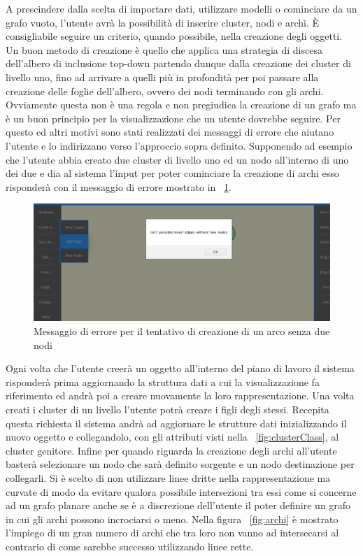 {A prescindere dalla scelta di importare dati, utilizzare modelli o cominciare da un grafo vuoto, l'utente avrà la possibilità di inserire cluster, nodi e archi. È consigliabile seguire un criterio, quando possibile, nella creazione degli oggetti. Un buon metodo di creazione è quello che applica una strategia di discesa dell'albero di inclusione top-down partendo dunque dalla creazione dei cluster di livello uno, fino ad arrivare a quelli più in profondità per poi passare alla creazione delle foglie dell'albero, ovvero dei nodi terminando con gli archi. Ovviamente questa non è una regola e non pregiudica la creazione di un grafo ma è un buon principio per la visualizzazione che un utente dovrebbe seguire. Per questo ed altri motivi sono stati realizzati dei messaggi di errore che aiutano l'utente e lo indirizzano verso l'approccio sopra definito. Supponendo ad esempio che l'utente abbia creato due cluster di livello uno ed un nodo all'interno di uno dei due e dia al sistema l'input per poter cominciare la creazione di archi esso risponderà con il messaggio di errore mostrato in \figurename~\ref{fig:erroreArco}.
\begin{figure}[!htb]
	\begin{center}
		\includegraphics[width=0.8 \linewidth]{figure/erroreArco}
	\end{center}
	\caption{Messaggio di errore per il tentativo di creazione di un arco senza due nodi\label{fig:erroreArco}}
\end{figure}
\newline
Ogni volta che l'utente creerà un oggetto all'interno del piano di lavoro il sistema risponderà prima aggiornando la struttura dati a cui la visualizzazione fa riferimento ed andrà poi a creare nuovamente la loro rappresentazione. Una volta creati i cluster di un livello l'utente potrà creare i figli degli stessi. Recepita questa richiesta il sistema andrà ad aggiornare le strutture dati inizializzando il nuovo oggetto e collegandolo, con gli attributi visti nella \figurename~\ref{fig:clusterClass}, al cluster genitore.
Infine per quando riguarda la creazione degli archi all'utente basterà selezionare un nodo che sarà definito sorgente e un nodo destinazione per collegarli. Si è scelto di non utilizzare linee dritte nella rappresentazione ma curvate di modo da evitare qualora possibile intersezioni tra essi come si concerne ad un grafo planare anche se è a discrezione dell'utente il poter definire un grafo in cui gli archi possono incrociarsi o meno. Nella figura \figurename~\ref{fig:archi} è mostrato l'impiego di un gran numero di archi che tra loro non vanno ad intersecarsi al contrario di come sarebbe successo utilizzando linee rette.
}
